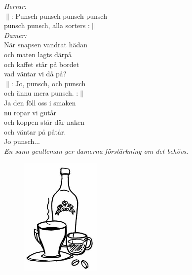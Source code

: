 \documentclass[a6paper,10pt]{article}
\begin{document}
\setlength{\oddsidemargin}{-0.47in}
\noindent
\begin{center}
\end{center}
\textit{Herrar:}
\vspace{4pt}\\
$\|$: Punsch punsch punsch punsch\\
punsch punsch, alla sorters :$\|$
\vspace{5pt}\\
\textit{Damer:}
\vspace{4pt}\\
När snapsen vandrat hädan\\
och maten lagts därpå\\
och kaffet står på bordet\\
vad väntar vi då på?
\vspace{5pt}\\
$\|$: Jo, punsch, och punsch\\
och ännu mera punsch. :$\|$
\vspace{5pt}\\
Ja den föll oss i smaken \\
nu ropar vi gutår\\
och koppen står där naken\\
och väntar på påtår.
\vspace{5pt}\\
Jo punsch...
\vspace{10pt}\\
\textit{En sann gentleman ger damerna förstärkning om det behövs.}
\begin{figure}[!h]
\centering
\includegraphics[width=0.35\textwidth]{kaffe.jpg}
\end{figure}
\end{document}

